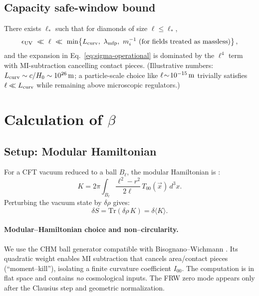 \documentclass[aps,prd,onecolumn,superscriptaddress,nofootinbib]{revtex4-2}
\begin{document}
\subsection{Capacity safe-window bound}
\label{sec:safe-window}
There exists \(\ell_\ast\) such that for diamonds of size \(\ell\le \ell_\ast\),
\begin{equation}
\epsilon_{\rm UV}\ \ll\ \ell\ \ll\ \min\!\left\{L_{\rm curv},\ \lambda_{\rm mfp},\ m_{i}^{-1}\ (\text{for fields treated as massless})\right\},
\end{equation}
and the expansion in Eq.~\eqref{eq:sigma-operational} is dominated by the \(\ell^4\) term with MI-subtraction cancelling contact pieces. (Illustrative numbers: \(L_{\rm curv}\sim c/H_0\sim 10^{26}\,{\rm m}\); a particle-scale choice like \(\ell\!\sim\!10^{-15}\,{\rm m}\) trivially satisfies \(\ell\ll L_{\rm curv}\) while remaining above microscopic regulators.)

\section{Calculation of \texorpdfstring{$\beta$}{beta}}
\label{sec:beta-calc}

\subsection{Setup: Modular Hamiltonian}
For a CFT vacuum reduced to a ball \(B_\ell\), the modular Hamiltonian is \cite{Casini2011}:
\begin{equation}
K = 2\pi \int_{B_\ell} \frac{\ell^2 - r^2}{2\ell} \, T_{00}(\vec{x}) \, d^3x.
\end{equation}
Perturbing the vacuum state by \(\delta\rho\) gives:
\begin{equation}
\delta S = \mathrm{Tr}(\delta\rho\, K) = \delta \langle K \rangle.
\end{equation}

\paragraph*{Modular–Hamiltonian choice and non–circularity.}
We use the CHM ball generator compatible with Bisognano--Wichmann \cite{BisognanoWichmann1975}. Its quadratic weight enables MI subtraction that cancels area/contact pieces (“moment–kill”), isolating a finite curvature coefficient \(I_{00}\). The computation is in flat space and contains \emph{no} cosmological inputs. The FRW zero mode appears only after the Clausius step and geometric normalization.
\end{document}

